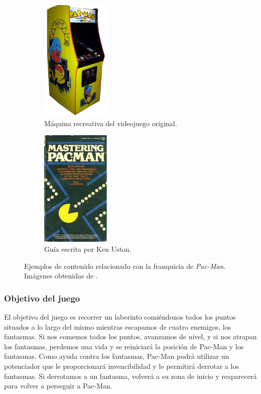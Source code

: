     \begin{figure}[H]
    \centering
        \begin{subfigure}[b]{0.49\textwidth}
        \centering
            \includegraphics[width=3.3cm]{img/cabinet3.png}
            \caption{Máquina recreativa del videojuego original.}
        \end{subfigure}
        \hfill
        \begin{subfigure}[b]{0.49\textwidth}
        \centering
            \includegraphics[width=3.3cm]{img/pbook.jpg}
            \caption{Guía escrita por Ken Uston.}
        \end{subfigure}
        \caption{Ejemplos de contenido relacionado con la franquicia de \textit{Pac-Man}. Imágenes obtenidas de \cite{pittman2015}.}
    \end{figure}

\subsubsection{Objetivo del juego}

El objetivo del juego es recorrer un laberinto comiéndonos todos los puntos situados a lo largo del mismo mientras escapamos de cuatro enemigos, los fantasmas. Si nos comemos todos los puntos, avanzamos de nivel, y si nos atrapan los fantasmas, perdemos una vida y se reiniciará la posición de Pac-Man y los fantasmas. Como ayuda contra los fantasmas, Pac-Man podrá utilizar un potenciador que le proporcionará invencibilidad y le permitirá derrotar a los fantasmas. Si derrotamos a un fantasma, volverá a su zona de inicio y reaparecerá para volver a perseguir a Pac-Man.

